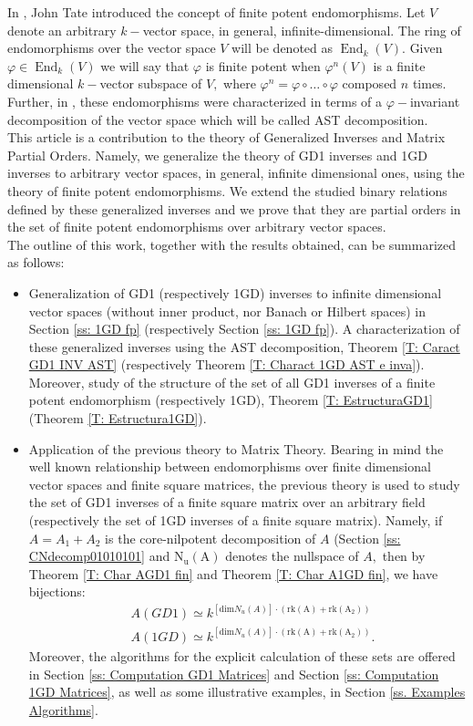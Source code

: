 \documentclass[10pt,a4paper]{amsart}
\theoremstyle{plain}
\theoremstyle{remark}
\numberwithin{equation}{section} \numberwithin{defn}{section}
\newcommand\ed{\operatorname{End}}
\newcommand{\f}{\varphi}
\begin{document}
In \cite{Ta}, John Tate introduced the concept of finite potent endomorphisms. Let $V$ denote an arbitrary $k-$vector space, in general, infinite-dimensional. The ring of endomorphisms over the vector space $V$ will be denoted as $\ed_k(V).$ Given $\f \in \ed_k(V)$ we will say that $\f$ is finite potent when $\f^n (V)$ is a finite dimensional $k-$vector subspace of $V,$ where $\f^n=\f\circ \dots \circ \f$ composed $n$ times. Further, in \cite{AST}, these endomorphisms were characterized in terms of a $\f -$invariant decomposition of the vector space which will be called AST decomposition.\\
This article is a contribution to the theory of Generalized Inverses and Matrix Partial Orders. Namely, we generalize the theory of GD1 inverses and 1GD inverses to arbitrary vector spaces, in general, infinite dimensional ones, using the theory of finite potent endomorphisms. We extend the studied binary relations defined by these generalized inverses and we prove that they are partial orders in the set of finite potent endomorphisms over arbitrary vector spaces.\\ The outline of this work, together with the results obtained, can be summarized as follows: \begin{itemize}
\item Generalization of GD1 (respectively 1GD) inverses to infinite dimensional vector spaces (without inner product, nor Banach or Hilbert spaces) in Section \ref{ss: 1GD fp} (respectively Section \ref{ss: 1GD fp}). A characterization of these generalized inverses using the AST decomposition, Theorem \ref{T: Caract GD1 INV AST} (respectively Theorem \ref{T: Charact 1GD AST e inva}). Moreover, study of the structure of the set of all GD1 inverses of a finite potent endomorphism (respectively 1GD), Theorem \ref{T: EstructuraGD1} (Theorem \ref{T: Estructura1GD}).

\item Application of the previous theory to Matrix Theory. Bearing in mind the well known relationship between endomorphisms over finite dimensional vector spaces and finite square matrices, the previous theory is used to study the set of GD1 inverses of a finite square matrix over an arbitrary field (respectively the set of 1GD inverses of a finite square matrix). Namely, if $A=A_1+A_2$ is the core-nilpotent decomposition of $A$ (Section \ref{ss: CNdecomp01010101} and $\mathrm{N_u(A)}$ denotes the nullspace of $A,$ then by Theorem \ref{T: Char AGD1 fin} and Theorem \ref{T: Char A1GD fin}, we have bijections: $$\begin{aligned}&A(GD1) \simeq  k^{[\mathrm{dim } N_u(A)]\cdot (\mathrm{rk (A)}+\mathrm{rk (A_2)}) }\\&A(1GD) \simeq  k^{[\mathrm{dim }N_u(A)]\cdot (\mathrm{rk (A)}+\mathrm{rk (A_2)}) } .\end{aligned} $$ Moreover, the algorithms for the explicit calculation of these sets are offered in Section \ref{ss: Computation GD1 Matrices} and Section \ref{ss: Computation 1GD Matrices}, as well as some illustrative examples, in Section \ref{ss. Examples Algorithms}.


\end{itemize}
\end{document}
